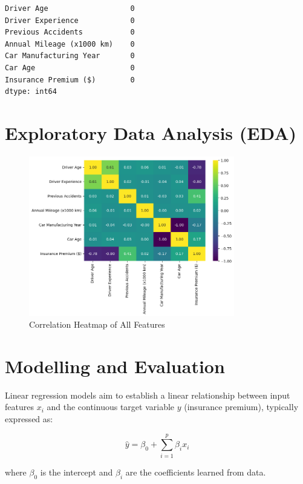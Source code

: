 \documentclass{article}
\begin{document}
\begin{verbatim}
Driver Age                   0
Driver Experience            0
Previous Accidents           0
Annual Mileage (x1000 km)    0
Car Manufacturing Year       0
Car Age                      0
Insurance Premium ($)        0
dtype: int64
\end{verbatim}





\newpage
\section{Exploratory Data Analysis (EDA)}

\begin{figure}[h]
\centering
\includegraphics[width=0.8\textwidth]{heatmap.png}
\caption{Correlation Heatmap of All Features}\label{fig:heatmap}
\end{figure}

\newpage
\section{Modelling and Evaluation}

Linear regression models aim to establish a linear relationship between input features $x_i$ and the continuous target variable $y$ (insurance premium), typically expressed as:

$$
\hat{y} = \beta_0 + \sum_{i=1}^p \beta_i x_i
$$

where $\beta_0$ is the intercept and $\beta_i$ are the coefficients learned from data\cite{hastie_09_elements-of.statistical-learning}.
\end{document}
